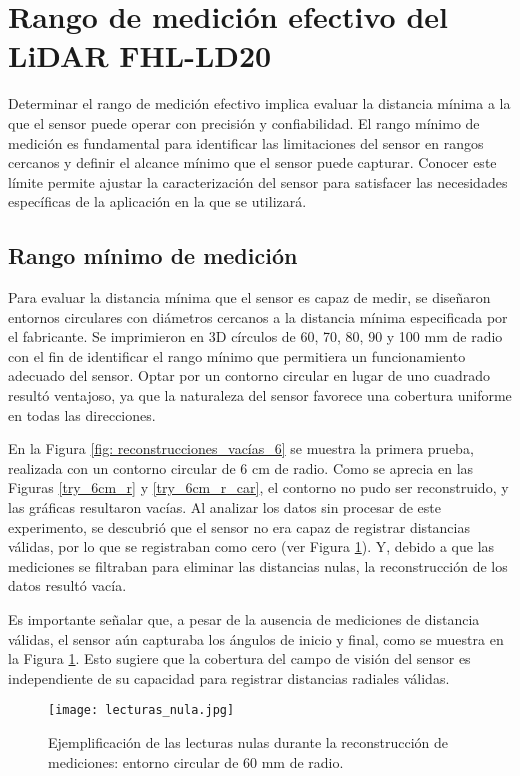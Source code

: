 \section{Rango de medición efectivo del LiDAR FHL-LD20}
\label{minima_dist}
Determinar el rango de medición efectivo implica evaluar la distancia mínima a la que el sensor puede operar con precisión y confiabilidad. El rango mínimo de medición es fundamental para identificar las limitaciones del sensor en rangos cercanos y definir el alcance mínimo que el sensor puede capturar. Conocer este límite permite ajustar la caracterización del sensor para satisfacer las necesidades específicas de la aplicación en la que se utilizará.

\subsection{Rango mínimo de medición}
Para evaluar la distancia mínima que el sensor es capaz de medir, se diseñaron entornos circulares con diámetros cercanos a la distancia mínima especificada por el fabricante. Se imprimieron en 3D círculos de 60, 70, 80, 90 y 100 mm de radio con el fin de identificar el rango mínimo que permitiera un funcionamiento adecuado del sensor. Optar por un contorno circular en lugar de uno cuadrado resultó ventajoso, ya que la naturaleza del sensor favorece una cobertura uniforme en todas las direcciones.

En la Figura \ref{fig: reconstrucciones_vacías_6} se muestra la primera prueba, realizada con un contorno circular de 6 cm de radio. Como se aprecia en las Figuras \ref{try_6cm_r} y \ref{try_6cm_r_car}, el contorno no pudo ser reconstruido, y las gráficas resultaron vacías. Al analizar los datos sin procesar de este experimento, se descubrió que el sensor no era capaz de registrar distancias válidas, por lo que se registraban como cero (ver Figura \ref{fig:data_null}). Y, debido a que las mediciones se filtraban para eliminar las distancias nulas, la reconstrucción de los datos resultó vacía. 

Es importante señalar que, a pesar de la ausencia de mediciones de distancia válidas, el sensor aún capturaba los ángulos de inicio y final, como se muestra en la Figura \ref{fig:data_null}. Esto sugiere que la cobertura del campo de visión del sensor es independiente de su capacidad para registrar distancias radiales válidas.
\begin{figure}[H]
	\centering
	\texttt{[image: lecturas\_nula.jpg]}
	\caption{Ejemplificación de las lecturas nulas durante la reconstrucción de mediciones: entorno circular de 60 mm de radio.}
	\label{fig:data_null}
\end{figure}

